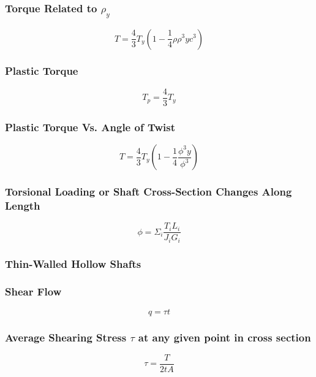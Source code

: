 \documentclass[10pt,landscape]{article}
\newenvironment{Figure}
     {\par\medskip\noindent\minipage{\linewidth}}
     {\endminipage\par\medskip}
\begin{document}
\begin{multicols}{3}
\subsubsection{Torque Related to $\rho_y$}
\begin{equation}
    T=\frac{4}{3}T_y(1-\frac{1}{4}\rho{\rho^3y}{c^3})
\end{equation}
\subsubsection{Plastic Torque}
\begin{equation}
    T_p=\frac{4}{3}T_y
\end{equation}
\subsubsection{Plastic Torque Vs. Angle of Twist}
\begin{equation}
    T=\frac{4}{3}T_y(1-\frac{1}{4}\frac{\phi^3y}{\phi^3})
\end{equation}
\subsubsection{Torsional Loading or Shaft Cross-Section Changes Along Length}
\begin{equation}
    \phi=\Sigma_i\frac{T_iL_i}{J_iG_i}
\end{equation}
\subsubsection{Thin-Walled Hollow Shafts}
\subsubsection{Shear Flow}
\begin{equation}
    q=\tau t
\end{equation}
\subsubsection{Average Shearing Stress $\tau$ at any given point in cross section}
\begin{equation}
    \tau=\frac{T}{2tA}
\end{equation}


%
%

\end{multicols}
\end{document}
